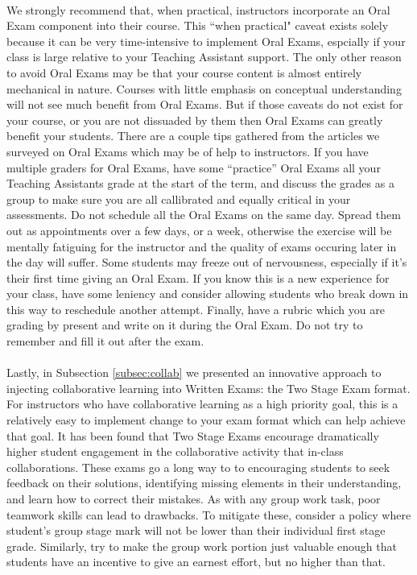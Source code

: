 \documentclass[12pt]{article}
\begin{document}
\paragraph{}
We strongly recommend that, when practical, instructors incorporate an Oral Exam component into their course. This ``when practical" caveat exists solely because it can be very time-intensive to implement Oral Exams, espcially if your class is large relative to your Teaching Assistant support. The only other reason to avoid Oral Exams may be that your course content is almost entirely mechanical in nature. Courses with little emphasis on conceptual understanding will not see much benefit from Oral Exams. But if those caveats do not exist for your course, or you are not dissuaded by them then Oral Exams can greatly benefit your students. There are a couple tips gathered from the articles we surveyed on Oral Exams which may be of help to instructors. If you have multiple graders for Oral Exams, have some ``practice'' Oral Exams all your Teaching Assistants grade at the start of the term, and discuss the grades as a group to make sure you are all callibrated and equally critical in your assessments. Do not schedule all the Oral Exams on the same day. Spread them out as appointments over a few days, or a week, otherwise the exercise will be mentally fatiguing for the instructor and the quality of exams occuring later in the day will suffer. Some students may freeze out of nervousness, especially if it's their first time giving an Oral Exam. If you know this is a new experience for your class, have some leniency and consider allowing students who break down in this way to reschedule another attempt. Finally, have a rubric which you are grading by present and write on it during the Oral Exam. Do not try to remember and fill it out after the exam. 
\paragraph{}
Lastly, in Subsection \ref{subsec:collab} we presented an innovative approach to injecting collaborative learning into Written Exams: the Two Stage Exam format. For instructors who have collaborative learning as a high priority goal, this is a relatively easy to implement change to your exam format which can help achieve that goal. It has been found that Two Stage Exams encourage dramatically higher student engagement in the collaborative activity that in-class collaborations. These exams go a long way to to encouraging students to seek feedback on their solutions, identifying missing elements in their understanding, and learn how to correct their mistakes. As with any group work task, poor teamwork skills can lead to drawbacks. To mitigate these, consider a policy where student's group stage mark will not be lower than their individual first stage grade. Similarly, try to make the group work portion just valuable enough that students have an incentive to give an earnest effort, but no higher than that. 
\end{document}
